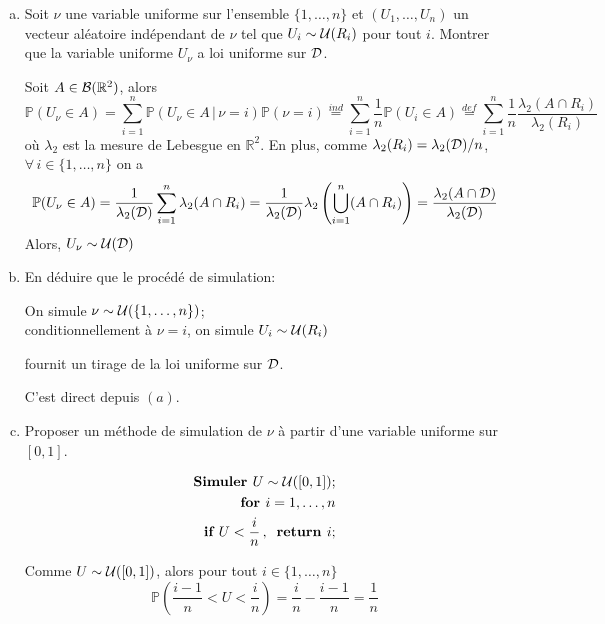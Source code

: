 \documentclass[a4paper]{article}
\begin{document}
\begin{enumerate}[(a)]
\item Soit $\nu$ une variable uniforme sur l'ensemble $\{1,\ldots,n\}$ et $(U_1,\ldots,U_n)$ un vecteur al\'eatoire ind\'ependant de $\nu$ tel que $U_i\sim{\cal U}(R_i)$ pour tout $i$. Montrer que la variable uniforme $U_{\nu}$ a loi uniforme sur ${\cal D}$.

Soit $A\in{\cal B}(\mathbb{R}^2)$, alors
$$\mathbb{P}(U_{\nu}\in A) = \sum\limits_{i=1}^n\mathbb{P}(U_{\nu}\in A\,|\,\nu=i)\mathbb{P}(\nu=i)\stackrel{ind}{=}\sum\limits_{i=1}^n\frac{1}{n}\mathbb{P}(U_i\in A)\stackrel{def}{=}\sum\limits_{i=1}^n\frac{1}{n}\frac{\lambda_2(A\cap R_i)}{\lambda_2(R_i)}$$
o\`u $\lambda_2$ est la mesure de Lebesgue en $\mathbb{R}^2$. En plus, comme $\lambda_2(R_i) = \lambda_2({\cal D})/n$, $\forall\,i\in\{1,\ldots,n\}$ on a
$$\mathbb{P}(U_{\nu}\in A) = \frac{1}{\lambda_2({\cal D})}\sum\limits_{i=1}^n\lambda_2(A\cap R_i) = \frac{1}{\lambda_2({\cal D})}\lambda_2\left(\bigcup\limits_{i=1}^n(A\cap R_i)\right) = \frac{\lambda_2(A\cap{\cal D})}{\lambda_2({\cal D})}$$
Alors, $U_{\nu}\sim{\cal U}({\cal D})$



\item En d\'eduire que le proc\'ed\'e de simulation:

\begin{center}
On simule $\nu\sim{\cal U}(\{1,\ldots,n\})$;\\
conditionnellement \`a $\nu=i$, on simule $U_i\sim{\cal U}(R_i)$
\end{center}
fournit un tirage de la loi uniforme sur ${\cal D}$.

C'est direct depuis $(a)$.


\item Proposer un m\'ethode de simulation de $\nu$ \`a partir d'une variable uniforme sur $[0,1]$.

\begin{align*}
\textbf{Simuler }U\sim{\cal U}([0,1]);\\
\textbf{for }i=1,\ldots,n\\\textbf{if }U<\frac{i}{n}\,,\, \textbf{ return }i;
\end{align*}

Comme $U\sim{\cal U}([0,1])$, alors pour tout $i\in\{1,\ldots,n\}$
$$\mathbb{P}\left(\frac{i-1}{n}<U<\frac{i}{n}\right) = \frac{i}{n}-\frac{i-1}{n} = \frac{1}{n}$$

\end{enumerate}
\end{document}
